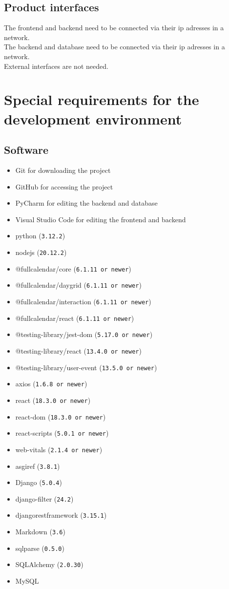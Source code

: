 \documentclass[]{article}
\begin{document}
	\subsection{Product interfaces}
		The frontend and backend need to be connected via their ip adresses in a network.\\
		The backend and database need to be connected via their ip adresses in a network.\\
		External interfaces are not needed.
\newpage
\section{Special requirements for the development environment}
	\subsection{Software}
		\begin{itemize}
			\item Git for downloading the project
			\item GitHub for accessing the project
			\item PyCharm for editing the backend and database
			\item Visual Studio Code for editing the frontend and backend
			\item python (\texttt{3.12.2})
			\item nodejs (\texttt{20.12.2})
			\item @fullcalendar/core (\texttt{6.1.11 or newer}) 
			\item @fullcalendar/daygrid (\texttt{6.1.11 or newer}) 
			\item @fullcalendar/interaction (\texttt{6.1.11 or newer}) 
			\item @fullcalendar/react (\texttt{6.1.11 or newer}) 
			\item @testing-library/jest-dom (\texttt{5.17.0 or newer}) 
			\item @testing-library/react (\texttt{13.4.0 or newer}) 
			\item @testing-library/user-event (\texttt{13.5.0 or newer}) 
			\item axios (\texttt{1.6.8 or newer}) 
			\item react (\texttt{18.3.0 or newer}) 
			\item react-dom (\texttt{18.3.0 or newer}) 
			\item react-scripts (\texttt{5.0.1 or newer}) 
			\item web-vitals (\texttt{2.1.4 or newer})
			\item asgiref (\texttt{3.8.1})
			\item Django (\texttt{5.0.4})
			\item django-filter (\texttt{24.2})
			\item djangorestframework (\texttt{3.15.1})
			\item Markdown (\texttt{3.6})
			\item sqlparse (\texttt{0.5.0})
			\item SQLAlchemy (\texttt{2.0.30})
			\item MySQL
		\end{itemize}
\end{document}
